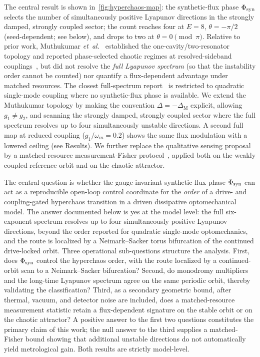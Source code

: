 \documentclass[preprint,numbers,a4paper]{elsarticle}
\begin{document}
The central result is shown in~\cref{fig:hyperchaos-map}: the synthetic-flux phase $\Phi_{\rm syn}$ selects the number of simultaneously positive Lyapunov directions in the strongly damped, strongly coupled sector; the count reaches four at $E=\num{8}$, $\theta=-\pi/2$ (seed-dependent; see below), and drops to two at $\theta=0\pmod{\pi}$. Relative to prior work, Muthukumar \emph{et~al.}~\cite{muthukumar2025doi} established the one-cavity/two-resonator topology and reported phase-selected chaotic regimes at resolved-sideband couplings~\cite{mondal2024doi,Xu2025}, but did not resolve the \emph{full Lyapunov spectrum} (so that the instability order cannot be counted) nor quantify a flux-dependent advantage under matched resources. The closest full-spectrum report~\cite{HalefShomroni2025} is restricted to quadratic single-mode coupling where no synthetic-flux phase is available. We extend the Muthukumar topology by making the convention $\Delta=-\Delta_{\mathrm M}$ explicit, allowing $g_1\neq g_2$, and scanning the strongly damped, strongly coupled sector where the full spectrum resolves up to four simultaneously unstable directions. A second full map at reduced coupling ($g_1/\omega_m=\num{0.2}$) shows the same flux modulation with a lowered ceiling (see Results). We further replace the qualitative sensing proposal by a matched-resource measurement-Fisher protocol~\cite{braunstein1994,purdy2017,teufel2011,gavartin2012,li2021a}, applied both on the weakly coupled reference orbit and on the chaotic attractor.

The central question is whether the gauge-invariant synthetic-flux phase $\Phi_{\rm syn}$ can act as a reproducible open-loop control coordinate for the \emph{order} of a drive- and coupling-gated hyperchaos transition in a driven dissipative optomechanical model. The answer documented below is yes at the model level: the full six-exponent spectrum resolves up to four simultaneously positive Lyapunov directions, beyond the order reported for quadratic single-mode optomechanics, and the route is localized by a Neimark--Sacker torus bifurcation of the continued drive-locked orbit. Three operational sub-questions structure the analysis. First, does $\Phi_{\rm syn}$ control the hyperchaos order, with the route localized by a continued-orbit scan to a Neimark--Sacker bifurcation? Second, do monodromy multipliers and the long-time Lyapunov spectrum agree on the same periodic orbit, thereby validating the classification? Third, as a secondary geometric bound, after thermal, vacuum, and detector noise are included, does a matched-resource measurement statistic retain a flux-dependent signature on the stable orbit or on the chaotic attractor? A positive answer to the first two questions constitutes the primary claim of this work; the null answer to the third supplies a matched-Fisher bound showing that additional unstable directions do not automatically yield metrological gain. Both results are strictly model-level.
\end{document}
